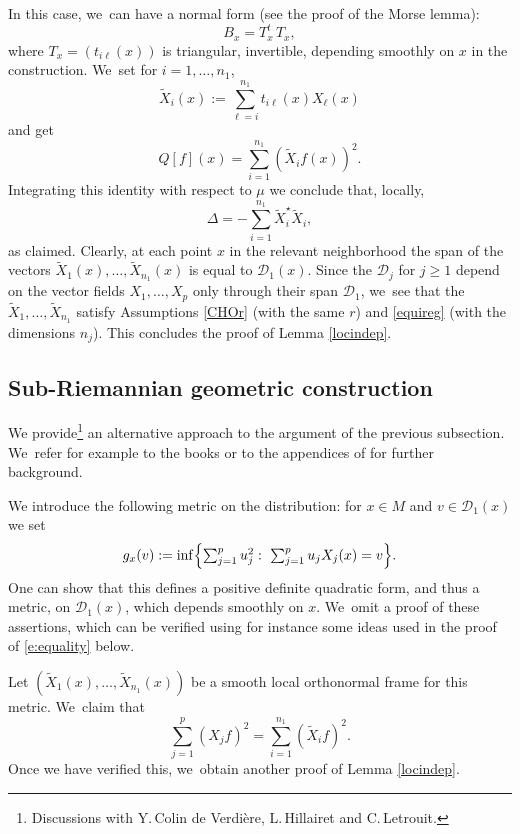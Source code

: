 \documentclass[10pt]{amsart}
\theoremstyle{definition}
\newcommand{\1}{\mathbbm{1}}
\begin{document}
In this case, we~can have a normal form (see the proof of the Morse lemma):
\[
B_x = T_x^t\,T_x,
\]
where $T_x = (t_{i\ell}(x))$ is triangular, invertible, depending smoothly on $x$ in the construction. We~set for $i=1,\ldots,n_1$,
\[
\tilde{X}_i(x) := \sum_{\ell=i}^{n_1} t_{i\ell}(x)X_\ell(x)
\]
and get
\[
Q[f](x) =\sum_{i=1}^{n_1} (\tilde{X}_i f(x))^2.
\]
Integrating this identity with respect to $\mu$ we conclude that, locally,
\[
\Delta = - \sum_{i=1}^{n_1} \tilde{X}_i^\star \tilde{X}_i,
\]
as claimed. Clearly, at each point $x$ in the relevant neighborhood the span of the vectors $\tilde X_1(x),\ldots,\tilde X_{n_1}(x)$ is equal to $\mathcal D_1(x)$. Since the $\mathcal D_j$ for $j\geq 1$ depend on the vector fields $X_1,\ldots,X_p$ only through their span $\mathcal D_1$, we~see that the $\tilde X_1,\ldots,\tilde X_{n_1}$ satisfy Assumptions \ref{CHOr} (with the same $r$) and \ref{equireg} (with the dimensions $n_j$). This concludes the proof of Lemma \ref{locindep}.

\subsection{Sub-Riemannian geometric construction}\label{sec:subriemannianortho}
We provide\footnote{Discussions with Y.\,Colin de Verdière, L.\,Hillairet and C.\,Letrouit.} an alternative approach to the argument of the previous subsection. We~refer for example to the books \cite{AgBaBo,Je} or to the appendices of \cite{CHT,CHT1} for further background.

We introduce the following metric on the distribution: for $x\in M$ and $v\in\mathcal D_1(x)$ we set
\[
g_x(v) := \inf\Bigl\{ \textstyle\sum_{j=1}^p u_j^2 :\ \sum_{j=1}^p u_j X_j(x)=v\Bigr\}.
\]
One can show that this defines a positive definite quadratic form, and thus a metric, on $\mathcal D_1(x)$, which depends smoothly on $x$. We~omit a proof of these assertions, which can be verified using for instance some ideas used in the proof of \eqref{e:equality} below.

Let $(\tilde{X}_1(x),\ldots,\tilde{X}_{n_1}(x))$ be a smooth local orthonormal frame for this metric. We~claim that
\begin{equation}\label{e:equality}
\sum_{j=1}^p (X_j f)^2=\sum_{i=1}^{n_1} (\tilde{X}_if)^2.
\end{equation}
Once we have verified this, we~obtain another proof of Lemma \ref{locindep}.
\end{document}
